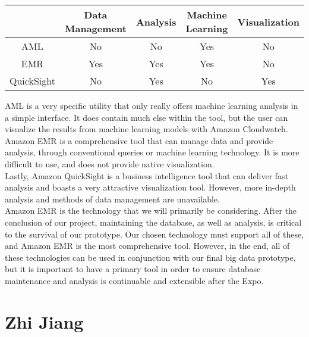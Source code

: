 \documentclass[10pt,draftclsnofoot,onecolumn,journal,compsoc]{IEEEtran}
\begin{document}
        \begin{table}[ht]
        \centering
        \begin{tabular}{|c|c|c|c|c|}
            \hline
            \textbf{} & \textbf{Data Management} & \textbf{Analysis} & \textbf{Machine Learning} & \textbf{Visualization}\\
            \hline
            AML & No & No & Yes & No\\
            \hline
            EMR & Yes & Yes & Yes & No\\
            \hline
            QuickSight & No & Yes & No & Yes\\
            \hline
        \end{tabular}
        \end{table}

        \noindent AML is a very specific utility that only really offers machine learning analysis in a simple interface. It does contain much else within the tool, but the user can visualize the results from machine learning models with Amazon Cloudwatch.\\ 
        
        \noindent Amazon EMR is a comprehensive tool that can manage data and provide analysis, through conventional queries or machine learning technology. It is more difficult to use, and does not provide native visualization.\\ 

        \noindent Lastly, Amazon QuickSight is a business intelligence tool that can deliver fast analysis and boasts a very attractive visualization tool. However, more in-depth analysis and methods of data management are unavailable.\\

        \noindent Amazon EMR is the technology that we will primarily be considering. After the conclusion of our project, maintaining the database, as well as analysis, is critical to the survival of our prototype. Our chosen technology must support all of these, and Amazon EMR is the most comprehensive tool. However, in the end, all of these technologies can be used in conjunction with our final big data prototype, but it is important to have a primary tool in order to ensure database maintenance and analysis is continuable and extensible after the Expo.\\
    
    \section{Zhi Jiang}
     
\end{document}
